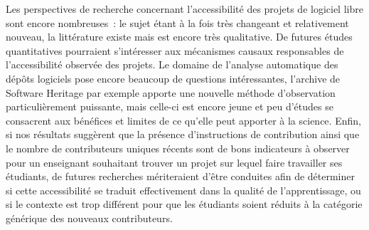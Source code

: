 \documentclass[dvipsnames,runningheads]{llncs}
\begin{document}
    Les perspectives de recherche concernant l'accessibilité des projets de logiciel libre sont encore
    nombreuses : le sujet étant à la fois très changeant et relativement nouveau, la littérature existe mais
    est encore très qualitative. De futures études quantitatives pourraient s'intéresser aux mécanismes
    causaux responsables de l'accessibilité observée des projets. Le domaine de l'analyse automatique des
    dépôts logiciels pose encore beaucoup de questions intéressantes, l'archive de Software Heritage par
    exemple apporte une nouvelle méthode d'observation particulièrement puissante, mais celle-ci est encore
    jeune et peu d'études se consacrent aux bénéfices et limites de ce qu'elle peut apporter à la science.
    Enfin, si nos résultats suggèrent que la présence d'instructions de contribution ainsi que le nombre de
    contributeurs uniques récents sont de bons indicateurs à observer pour un enseignant souhaitant trouver un
    projet sur lequel faire travailler ses étudiants, de futures recherches mériteraient d'être conduites afin
    de déterminer si cette accessibilité se traduit effectivement dans la qualité de l'apprentissage, ou si le
    contexte est trop différent pour que les étudiants soient réduits à la catégorie générique des nouveaux
    contributeurs.

    \printbibliography[heading=bibintoc]
\end{document}
